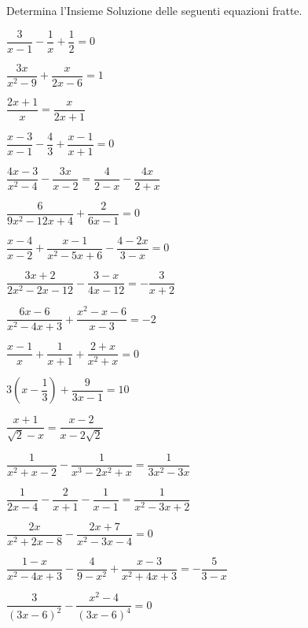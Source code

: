 \begin{esercizio}[*]
\label{ese:3.43}
Determina l'Insieme Soluzione delle seguenti equazioni fratte.
\begin{enumeratea}
\item \(\dfrac{3}{x-1}-\dfrac{1}{x} + \dfrac{1}{2} = 0\)
\item \(\dfrac{3 x}{x^{2}-9} + \dfrac{x}{2 x-6}=1\)
\item \(\dfrac{2 x + 1}{x} = \dfrac{x}{2 x + 1}\)
\item \(\dfrac{x-3}{x-1}-\dfrac{4}{3} + \dfrac{x-1}{x + 1}=0\)
\item \(\dfrac{4 x-3}{x^{2}-4}-\dfrac{3 x}{x-2} = \dfrac{4}{2-x}-\dfrac{4 
x}{2 + x}\)
\item \(\dfrac{6}{9 x^{2}-12 x + 4} + \dfrac{2}{6x -1} =0\)
\item \(\dfrac{x-4}{x-2} + \dfrac{x-1}{x^{2}-5 x + 6}-\dfrac{4 -2 x}{3-x} = 0\)
\item \(\dfrac{3 x + 2}{2 x^{2}-2 x-12}-\dfrac{3-x}{4 x-12} = - \dfrac{3}{x + 
2}\)
\item \(\dfrac{6 x-6}{x^{2}-4 x + 3} + \dfrac{x^{2}-x-6}{x-3}=-2\)
\item \(\dfrac{x-1}{x} + \dfrac{1}{x + 1} + \dfrac{2 + x}{x^{2} + x} =0\)
\item \(3 \left(x-\dfrac{1}{3} \right) + \dfrac{9}{3x-1} = 10\)
\item \(\dfrac{x + 1}{\sqrt{2}-x} = \dfrac{x-2}{x-2 \sqrt{2}}\)
\item \(\dfrac{1}{x^{2} + x-2}-\dfrac{1}{x^{3}-2 x^{2} + x}=\dfrac{1}{3 
x^{2}-3 x}\)
\item \(\dfrac{1}{2 x-4}-\dfrac{2}{x + 1}-\dfrac{1}{x-1}=\dfrac{1}{x^{2}-3 x 
+ 2}\)
\item \(\dfrac{2 x}{x^{2} + 2 x-8}-\dfrac{2 x + 7}{x^{2}-3 x-4}= 0\)
\item \(\dfrac{1-x}{x^{2}-4 x + 3}-\dfrac{4}{9-x^{2}} + \dfrac{x- 3}{x^{2} + 
4 x + 
3} =-\dfrac{5}{3-x}\)
\item \(\dfrac{3}{(3 x-6)^{2}}-\dfrac{x^{2}-4}{(3 x-6)^{4}} = 0\)
\end{enumeratea}
\end{esercizio}

